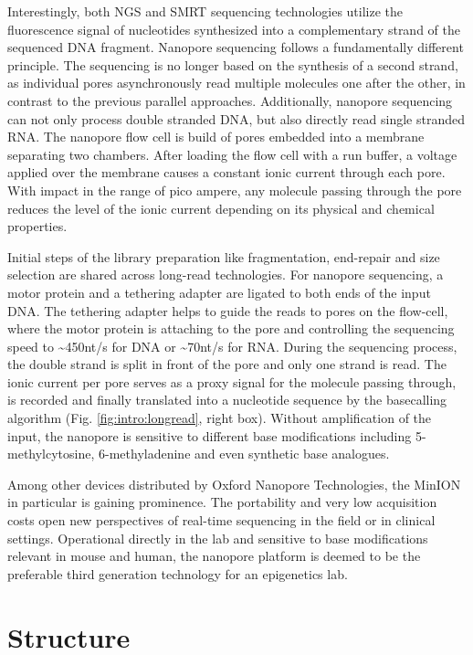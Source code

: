 Interestingly, both NGS and SMRT sequencing technologies utilize the fluorescence signal of nucleotides synthesized into a complementary strand of the sequenced DNA fragment.
Nanopore sequencing follows a fundamentally different principle.
The sequencing is no longer based on the synthesis of a second strand, as individual pores asynchronously read multiple molecules one after the other, in contrast to the previous parallel approaches.
Additionally, nanopore sequencing can not only process double stranded DNA, but also directly read single stranded RNA.
The nanopore flow cell is build of pores embedded into a membrane separating two chambers.
After loading the flow cell with a run buffer, a voltage applied over the membrane causes a constant ionic current through each pore.
With impact in the range of pico ampere, any molecule passing through the pore reduces the level of the ionic current depending on its physical and chemical properties.

Initial steps of the library preparation like fragmentation, end-repair and size selection are shared across long-read technologies.
For nanopore sequencing, a motor protein and a tethering adapter are ligated to both ends of the input DNA.
The tethering adapter helps to guide the reads to pores on the flow-cell, where the motor protein is attaching to the pore and controlling the sequencing speed to \textasciitilde450nt/s for DNA or \textasciitilde70nt/s for RNA.
During the sequencing process, the double strand is split in front of the pore and only one strand is read.
The ionic current per pore serves as a proxy signal for the molecule passing through, is recorded and finally translated into a nucleotide sequence by the basecalling algorithm (Fig. \ref{fig:intro:longread}, right box).
Without amplification of the input, the nanopore is sensitive to different base modifications including 5-methylcytosine, 6-methyladenine and even synthetic base analogues.

Among other devices distributed by Oxford Nanopore Technologies, the MinION in particular is gaining prominence. 
The portability and very low acquisition costs open new perspectives of real-time sequencing in the field or in clinical settings.
Operational directly in the lab and sensitive to base modifications relevant in mouse and human, the nanopore platform is deemed to be the preferable third generation technology for an epigenetics lab.




\section{Structure}
\label{sec:intro:structure}

